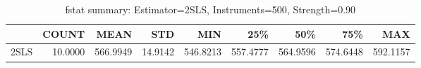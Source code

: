 \begin{table}[ht]
\centering
\caption{fstat summary: Estimator=2SLS, Instruments=500, Strength=0.90}
\begin{tabular}{lrrrrrrrr}
\toprule
 & COUNT & MEAN & STD & MIN & 25\% & 50\% & 75\% & MAX \\
\midrule
2SLS & 10.0000 & 566.9949 & 14.9142 & 546.8213 & 557.4777 & 564.9596 & 574.6448 & 592.1157 \\
\bottomrule
\end{tabular}
\end{table}
